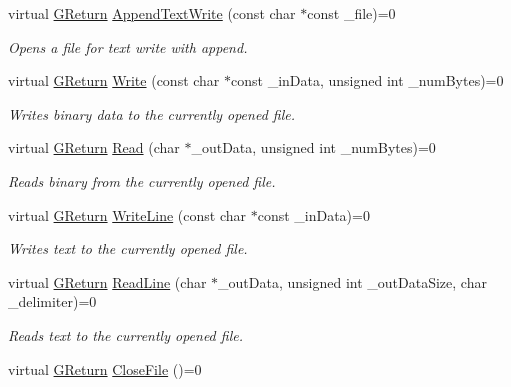 \begin{DoxyCompactItemize}
virtual \hyperlink{namespaceGW_a67a839e3df7ea8a5c5686613a7a3de21}{G\+Return} \hyperlink{classGW_1_1SYSTEM_1_1GFile_a72e40b3234a2384738d8db6e958f4782}{Append\+Text\+Write} (const char $\ast$const \+\_\+file)=0
\begin{DoxyCompactList}\small\item\em Opens a file for text write with append. \end{DoxyCompactList}\item 
virtual \hyperlink{namespaceGW_a67a839e3df7ea8a5c5686613a7a3de21}{G\+Return} \hyperlink{classGW_1_1SYSTEM_1_1GFile_ae9906414c159e9f1156b5ff6ad511c31}{Write} (const char $\ast$const \+\_\+in\+Data, unsigned int \+\_\+num\+Bytes)=0
\begin{DoxyCompactList}\small\item\em Writes binary data to the currently opened file. \end{DoxyCompactList}\item 
virtual \hyperlink{namespaceGW_a67a839e3df7ea8a5c5686613a7a3de21}{G\+Return} \hyperlink{classGW_1_1SYSTEM_1_1GFile_a1aaa026cba3d37abaaa2b408cd5d322d}{Read} (char $\ast$\+\_\+out\+Data, unsigned int \+\_\+num\+Bytes)=0
\begin{DoxyCompactList}\small\item\em Reads binary from the currently opened file. \end{DoxyCompactList}\item 
virtual \hyperlink{namespaceGW_a67a839e3df7ea8a5c5686613a7a3de21}{G\+Return} \hyperlink{classGW_1_1SYSTEM_1_1GFile_a7c57570575c63ae98f71232660d1b911}{Write\+Line} (const char $\ast$const \+\_\+in\+Data)=0
\begin{DoxyCompactList}\small\item\em Writes text to the currently opened file. \end{DoxyCompactList}\item 
virtual \hyperlink{namespaceGW_a67a839e3df7ea8a5c5686613a7a3de21}{G\+Return} \hyperlink{classGW_1_1SYSTEM_1_1GFile_ae9e072091ffe55f2f7697cb1d3eaec79}{Read\+Line} (char $\ast$\+\_\+out\+Data, unsigned int \+\_\+out\+Data\+Size, char \+\_\+delimiter)=0
\begin{DoxyCompactList}\small\item\em Reads text to the currently opened file. \end{DoxyCompactList}\item 
virtual \hyperlink{namespaceGW_a67a839e3df7ea8a5c5686613a7a3de21}{G\+Return} \hyperlink{classGW_1_1SYSTEM_1_1GFile_ae661d107c461145bb095dcfc76519f54}{Close\+File} ()=0

\end{DoxyCompactItemize}
